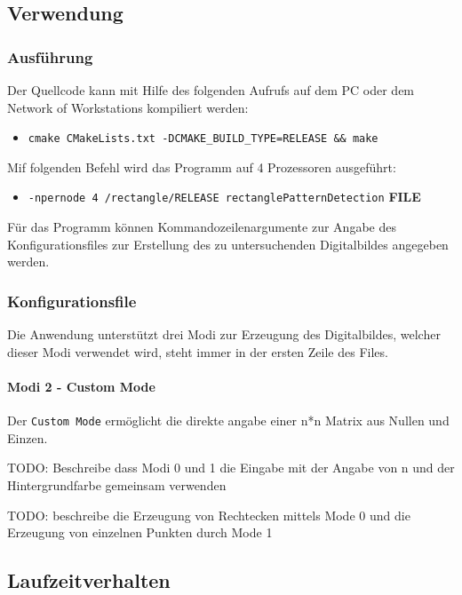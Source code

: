 \subsection{Verwendung}
\subsubsection{Ausführung}
Der Quellcode kann mit Hilfe des folgenden Aufrufs auf dem PC oder dem Network of Workstations kompiliert werden:

\begin{itemize}
	\item \texttt{cmake CMakeLists.txt -DCMAKE\_BUILD\_TYPE=RELEASE \&\& make}
\end{itemize}

Mif folgenden Befehl wird das Programm auf 4 Prozessoren ausgeführt:

\begin{itemize}
	\item \texttt{-npernode 4 /rectangle/RELEASE rectanglePatternDetection} \textbf{FILE}
\end{itemize}

Für das Programm können Kommandozeilenargumente zur Angabe des Konfigurationsfiles zur Erstellung des zu untersuchenden Digitalbildes angegeben werden.

\subsubsection{Konfigurationsfile}
Die Anwendung unterstützt drei Modi zur Erzeugung des Digitalbildes, welcher dieser Modi verwendet wird, steht immer in der ersten Zeile des Files.

\paragraph{Modi 2 - Custom Mode}Der \texttt{Custom Mode} ermöglicht die direkte angabe einer n*n Matrix aus Nullen und Einzen.

TODO: Beschreibe dass Modi 0 und 1 die Eingabe mit der Angabe von n und der Hintergrundfarbe gemeinsam verwenden 

TODO: beschreibe die Erzeugung von Rechtecken mittels Mode 0 und die Erzeugung von einzelnen Punkten durch Mode 1

\subsection{Laufzeitverhalten}

